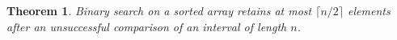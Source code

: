 \documentclass{article}
\newtheorem{theorem}{Theorem}
\begin{document}
\begin{theorem}\label{thm:G03}
Binary search on a sorted array retains at most $\lceil n/2\rceil$ elements after an unsuccessful comparison of an interval of length $n$.
\end{theorem}
\end{document}
